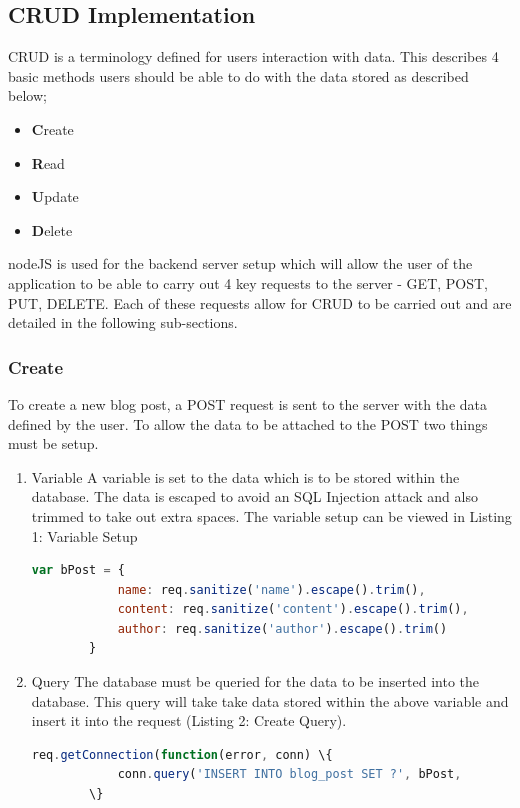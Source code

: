 \documentclass[10pt, a4paper]{article}
\begin{document}
\subsection{CRUD Implementation}
CRUD is a terminology defined for users interaction with data.  This describes 4 basic methods users should be able to do with the data stored as described below;
\begin{itemize}
\item \textbf{C}reate
\item \textbf{R}ead 
\item \textbf{U}pdate 
\item \textbf{D}elete 
\end{itemize}

nodeJS is used for the backend server setup which will allow the user of the application  to be able to carry out 4 key requests to the server - GET, POST, PUT, DELETE. Each of these requests allow for CRUD to be carried out and are detailed in the following sub-sections. 
\subsubsection{Create}
To create a new blog post, a POST request is sent to the server with the data defined by the user. To allow the data to be attached to the POST two things must be setup.
\begin{enumerate}
\item Variable
A variable is set to the data which is to be stored within the database. The data is escaped to avoid an SQL Injection attack and also trimmed to take out extra spaces. The variable setup can be viewed in Listing 1: Variable Setup

\begin{lstlisting}[language=javascript,caption={Variable Setup}]
var bPost = {
            name: req.sanitize('name').escape().trim(),
            content: req.sanitize('content').escape().trim(),
            author: req.sanitize('author').escape().trim()
        }
\end{lstlisting}

\item Query
The database must be queried for the data to be inserted into the database.  This query will take take data stored within the above variable and insert it into the request (Listing 2: Create Query).
\begin{lstlisting}[language=javascript,caption={Create Query}]
req.getConnection(function(error, conn) \{
            conn.query('INSERT INTO blog_post SET ?', bPost,
        \}
\end{lstlisting}
\end{enumerate}
\end{document}
